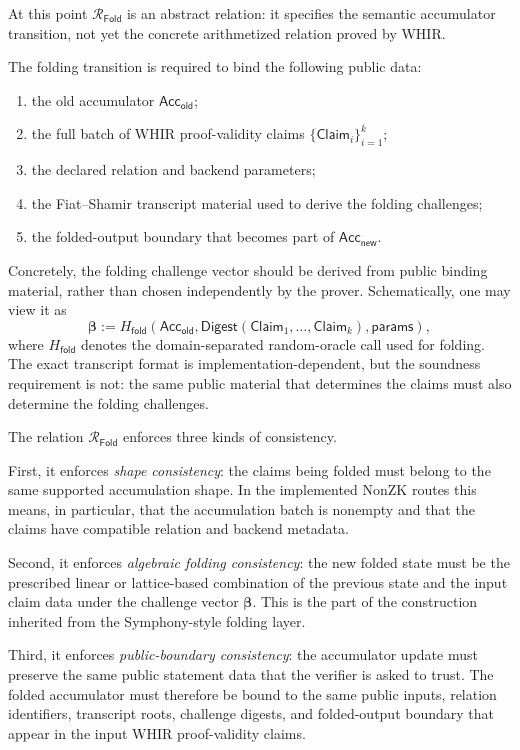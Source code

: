 \documentclass[11pt]{article}
\theoremstyle{definition}
\newcommand{\Acc}{\mathsf{Acc}}
\newcommand{\Rfold}{\mathcal{R}_{\mathsf{Fold}}}
\begin{document}
At this point $\Rfold$ is an abstract relation: it specifies the semantic
accumulator transition, not yet the concrete arithmetized relation proved by
WHIR.

The folding transition is required to bind the following public data:
\begin{enumerate}
  \item the old accumulator $\Acc_{\mathsf{old}}$;
  \item the full batch of WHIR proof-validity claims
        $\{\mathsf{Claim}_i\}_{i=1}^k$;
  \item the declared relation and backend parameters;
  \item the Fiat--Shamir transcript material used to derive the folding
        challenges;
  \item the folded-output boundary that becomes part of
        $\Acc_{\mathsf{new}}$.
\end{enumerate}

Concretely, the folding challenge vector should be derived from public binding
material, rather than chosen independently by the prover. Schematically, one may
view it as
\[
  \boldsymbol{\beta}
  :=
  H_{\mathsf{fold}}\!\left(
    \Acc_{\mathsf{old}},
    \mathsf{Digest}(\mathsf{Claim}_1,\ldots,\mathsf{Claim}_k),
    \mathsf{params}
  \right),
\]
where $H_{\mathsf{fold}}$ denotes the domain-separated random-oracle call used
for folding. The exact transcript format is implementation-dependent, but the
soundness requirement is not: the same public material that determines the
claims must also determine the folding challenges.

The relation $\Rfold$ enforces three kinds of consistency.

First, it enforces \emph{shape consistency}: the claims being folded must belong
to the same supported accumulation shape. In the implemented NonZK routes this
means, in particular, that the accumulation batch is nonempty and that the claims
have compatible relation and backend metadata.

Second, it enforces \emph{algebraic folding consistency}: the new folded state
must be the prescribed linear or lattice-based combination of the previous state
and the input claim data under the challenge vector $\boldsymbol{\beta}$. This
is the part of the construction inherited from the Symphony-style folding layer.

Third, it enforces \emph{public-boundary consistency}: the accumulator update
must preserve the same public statement data that the verifier is asked to trust.
The folded accumulator must therefore be bound to the same public inputs,
relation identifiers, transcript roots, challenge digests, and folded-output
boundary that appear in the input WHIR proof-validity claims.
\end{document}
